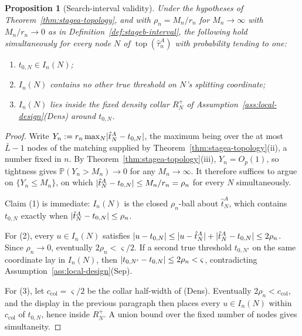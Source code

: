 \documentclass[11pt]{article}
\theoremstyle{plain}
\newtheorem{proposition}[theorem]{Proposition}
\theoremstyle{definition}
\theoremstyle{remark}
\newcommand{\PP}{\mathbb{P}}
\DeclarePairedDelimiter{\abs}{\lvert}{\rvert}
\newcommand{\topol}{\operatorname{top}}
\begin{document}
\begin{proposition}[Search-interval validity]\label{prop:search-interval}
Under the hypotheses of Theorem~\ref{thm:stagea-topology}, and with
\(\rho_n=M_n/r_n\) for \(M_n\to\infty\) with \(M_n/r_n\to0\) as in
Definition~\ref{def:stageb-interval}, the following hold simultaneously for
every node \(N\) of \(\topol(\hat\tau^A_n)\) with probability tending to one:
\begin{enumerate}[label=(\arabic*),nosep]
  \item \(t_{0,N}\in I_n(N)\);
  \item \(I_n(N)\) contains no \emph{other} true threshold on \(N\)'s
  splitting coordinate;
  \item \(I_n(N)\) lies inside the fixed density collar \(R_N^+\) of
  Assumption~\ref{ass:local-design}(Dens) around \(t_{0,N}\).
\end{enumerate}
\end{proposition}

\begin{proof}
Write \(Y_n:=r_n\max_N\abs{\hat t^A_N-t_{0,N}}\), the maximum being over the
at most \(\bar L-1\) nodes of the matching supplied by
Theorem~\ref{thm:stagea-topology}(ii), a number fixed in \(n\). By
Theorem~\ref{thm:stagea-topology}(iii), \(Y_n=O_p(1)\), so tightness gives
\(\PP(Y_n>M_n)\to0\) for any \(M_n\to\infty\). It therefore suffices to argue
on \(\{Y_n\le M_n\}\), on which \(\abs{\hat t^A_N-t_{0,N}}\le M_n/r_n=\rho_n\)
for every \(N\) simultaneously.

Claim (1) is immediate: \(I_n(N)\) is the closed \(\rho_n\)-ball about
\(\hat t^A_N\), which contains \(t_{0,N}\) exactly when
\(\abs{\hat t^A_N-t_{0,N}}\le\rho_n\).

For (2), every \(u\in I_n(N)\) satisfies
\(\abs{u-t_{0,N}}\le\abs{u-\hat t^A_N}+\abs{\hat t^A_N-t_{0,N}}\le2\rho_n\).
Since \(\rho_n\to0\), eventually \(2\rho_n<\varsigma/2\). If a second true
threshold \(t_{0,N'}\) on the same coordinate lay in \(I_n(N)\), then
\(\abs{t_{0,N'}-t_{0,N}}\le2\rho_n<\varsigma\), contradicting
Assumption~\ref{ass:local-design}(Sep).

For (3), let \(c_{\mathrm{col}}=\varsigma/2\) be the collar half-width of
(Dens). Eventually \(2\rho_n<c_{\mathrm{col}}\), and the display in the
previous paragraph then places every \(u\in I_n(N)\) within
\(c_{\mathrm{col}}\) of \(t_{0,N}\), hence inside \(R_N^+\). A union bound
over the fixed number of nodes gives simultaneity.
\end{proof}
\end{document}
